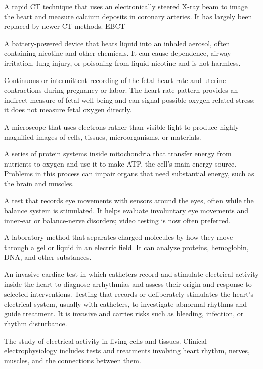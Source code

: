  A rapid CT technique that uses an electronically steered X-ray beam to image the heart and measure calcium deposits in coronary arteries. It has largely been replaced by newer CT methods.
\synonyms
EBCT

 A battery-powered device that heats liquid into an inhaled aerosol, often containing nicotine and other chemicals. It can cause dependence, airway irritation, lung injury, or poisoning from liquid nicotine and is not harmless.

 Continuous or intermittent recording of the fetal heart rate and uterine contractions during pregnancy or labor. The heart-rate pattern provides an indirect measure of fetal well-being and can signal possible oxygen-related stress; it does not measure fetal oxygen directly.

 A microscope that uses electrons rather than visible light to produce highly magnified images of cells, tissues, microorganisms, or materials.

 A series of protein systems inside mitochondria that transfer energy from nutrients to oxygen and use it to make ATP, the cell’s main energy source. Problems in this process can impair organs that need substantial energy, such as the brain and muscles.

 A test that records eye movements with sensors around the eyes, often while the balance system is stimulated. It helps evaluate involuntary eye movements and inner-ear or balance-nerve disorders; video testing is now often preferred.

 A laboratory method that separates charged molecules by how they move through a gel or liquid in an electric field. It can analyze proteins, hemoglobin, DNA, and other substances.

 An invasive cardiac test in which catheters record and stimulate electrical activity inside the heart to diagnose arrhythmias and assess their origin and response to selected interventions.
 Testing that records or deliberately stimulates the heart’s electrical system, usually with catheters, to investigate abnormal rhythms and guide treatment. It is invasive and carries risks such as bleeding, infection, or rhythm disturbance.

 The study of electrical activity in living cells and tissues. Clinical electrophysiology includes tests and treatments involving heart rhythm, nerves, muscles, and the connections between them.


